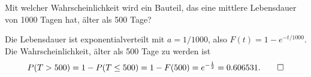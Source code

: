 Mit welcher Wahrscheinlichkeit wird ein Bauteil, das eine mittlere Lebensdauer
von 1000 Tagen hat, älter als 500 Tage?

\begin{loesung}
Die Lebensdauer ist exponentialverteilt mit $a=1/1000$, also
$F(t)=1-e^{-t/1000}$. Die Wahrscheinlichkeit, älter als 500 Tage
zu werden ist
\[
P(T > 500)=1-P(T\le 500)=1-F(500)=e^{-\frac12}=0.606531.
\qedhere
\]
\end{loesung}
